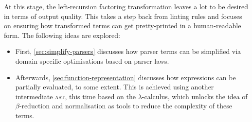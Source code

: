 \documentclass[../../main.tex]{subfiles}
\begin{document}
\label{sec:impl}
At this stage, the left-recursion factoring transformation leaves a lot to be desired in terms of output quality.
This  takes a step back from linting rules and focuses on ensuring how transformed terms can get pretty-printed in a human-readable form.
The following ideas are explored:
\begin{itemize}
  \item First, \cref{sec:simplify-parsers} discusses how parser terms can be simplified via domain-specific optimisations based on parser laws.
  \item Afterwards, \cref{sec:function-representation} discusses how expressions can be partially evaluated, to some extent. This is achieved using another intermediate \textsc{ast}, this time based on the $\lambda$-calculus, which unlocks the idea of $\beta$-reduction and normalisation as tools to reduce the complexity of these terms.
\end{itemize}




\end{document}
